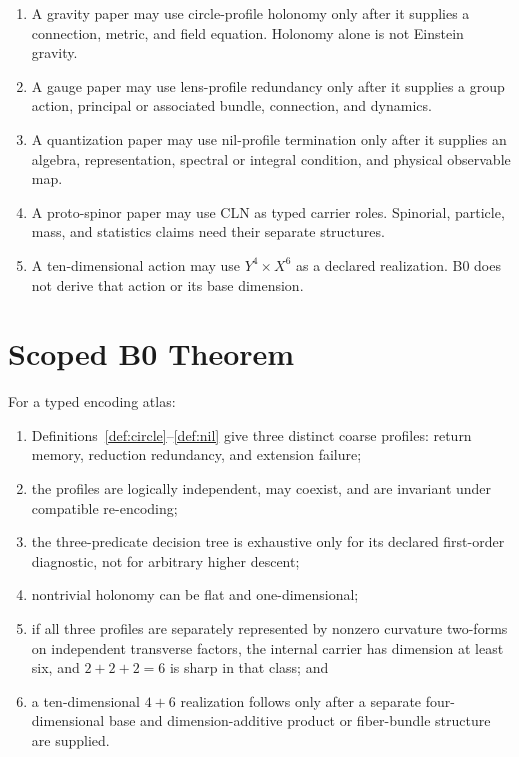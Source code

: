 \documentclass[11pt]{article}
\begin{document}
\begin{enumerate}
\item A gravity paper may use circle-profile holonomy only after it supplies a
connection, metric, and field equation.  Holonomy alone is not Einstein
gravity.
\item A gauge paper may use lens-profile redundancy only after it supplies a
group action, principal or associated bundle, connection, and dynamics.
\item A quantization paper may use nil-profile termination only after it
supplies an algebra, representation, spectral or integral condition, and
physical observable map.
\item A proto-spinor paper may use CLN as typed carrier roles.  Spinorial,
particle, mass, and statistics claims need their separate structures.
\item A ten-dimensional action may use $Y^4\times X^6$ as a declared
realization.  B0 does not derive that action or its base dimension.
\end{enumerate}

\section{Scoped B0 Theorem}

\begin{theorem}
\label{thm:scope}
For a typed encoding atlas:
\begin{enumerate}
\item Definitions~\ref{def:circle}--\ref{def:nil} give three distinct coarse
profiles: return memory, reduction redundancy, and extension failure;
\item the profiles are logically independent, may coexist, and are invariant
under compatible re-encoding;
\item the three-predicate decision tree is exhaustive only for its declared
first-order diagnostic, not for arbitrary higher descent;
\item nontrivial holonomy can be flat and one-dimensional;
\item if all three profiles are separately represented by nonzero curvature
two-forms on independent transverse factors, the internal carrier has
dimension at least six, and $2+2+2=6$ is sharp in that class; and
\item a ten-dimensional $4+6$ realization follows only after a separate
four-dimensional base and dimension-additive product or fiber-bundle structure
are supplied.
\end{enumerate}
\end{theorem}
\end{document}
